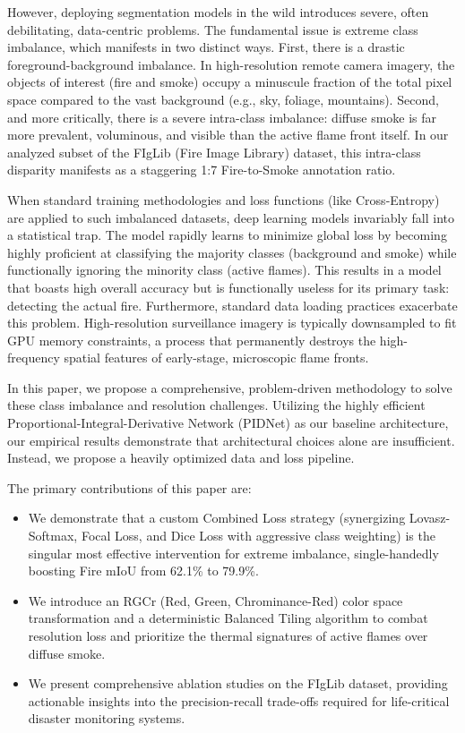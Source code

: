 \documentclass[conference]{IEEEtran}
\begin{document}
However, deploying segmentation models in the wild introduces severe, often debilitating, data-centric problems. The fundamental issue is extreme class imbalance, which manifests in two distinct ways. First, there is a drastic foreground-background imbalance. In high-resolution remote camera imagery, the objects of interest (fire and smoke) occupy a minuscule fraction of the total pixel space compared to the vast background (e.g., sky, foliage, mountains). Second, and more critically, there is a severe intra-class imbalance: diffuse smoke is far more prevalent, voluminous, and visible than the active flame front itself. In our analyzed subset of the FIgLib (Fire Image Library) dataset, this intra-class disparity manifests as a staggering 1:7 Fire-to-Smoke annotation ratio.

When standard training methodologies and loss functions (like Cross-Entropy) are applied to such imbalanced datasets, deep learning models invariably fall into a statistical trap. The model rapidly learns to minimize global loss by becoming highly proficient at classifying the majority classes (background and smoke) while functionally ignoring the minority class (active flames). This results in a model that boasts high overall accuracy but is functionally useless for its primary task: detecting the actual fire. Furthermore, standard data loading practices exacerbate this problem. High-resolution surveillance imagery is typically downsampled to fit GPU memory constraints, a process that permanently destroys the high-frequency spatial features of early-stage, microscopic flame fronts.

In this paper, we propose a comprehensive, problem-driven methodology to solve these class imbalance and resolution challenges. Utilizing the highly efficient Proportional-Integral-Derivative Network (PIDNet) \cite{pidnet} as our baseline architecture, our empirical results demonstrate that architectural choices alone are insufficient. Instead, we propose a heavily optimized data and loss pipeline.

The primary contributions of this paper are:
\begin{itemize}
    \item We demonstrate that a custom Combined Loss strategy (synergizing Lovasz-Softmax, Focal Loss, and Dice Loss with aggressive class weighting) is the singular most effective intervention for extreme imbalance, single-handedly boosting Fire mIoU from 62.1\% to 79.9\%.
    \item We introduce an RGCr (Red, Green, Chrominance-Red) color space transformation and a deterministic Balanced Tiling algorithm to combat resolution loss and prioritize the thermal signatures of active flames over diffuse smoke.
    \item We present comprehensive ablation studies on the FIgLib dataset, providing actionable insights into the precision-recall trade-offs required for life-critical disaster monitoring systems.
\end{itemize}
\end{document}
